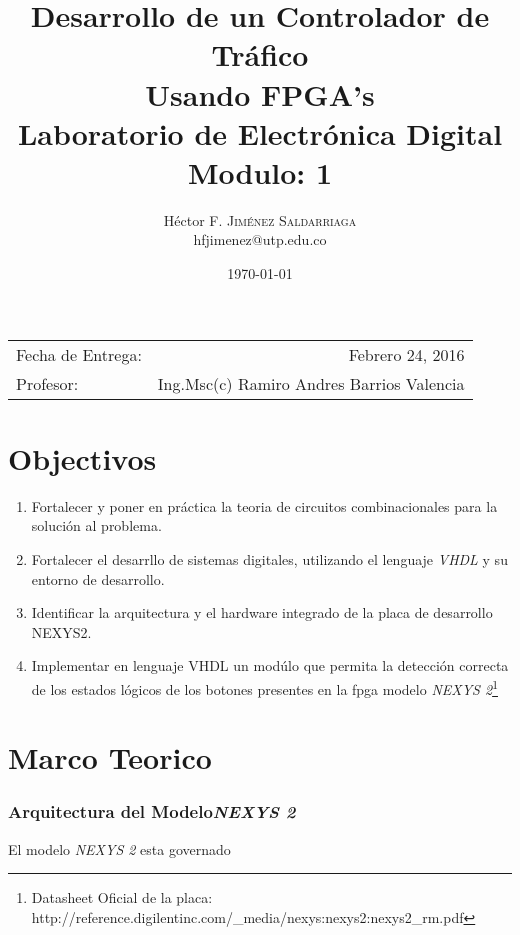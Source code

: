 \documentclass{article}
\title{Desarrollo de un Controlador de Tráfico\\ Usando FPGA's \\ Laboratorio de Electrónica Digital\\Modulo: 1} %
\author{Héctor F. \textsc{Jiménez Saldarriaga}\\ hfjimenez@utp.edu.co} %
\date{\today}                           %
\begin{document}
\maketitle                              %
\begin{center}
\begin{tabular}{l r}
Fecha de Entrega: & Febrero 24, 2016 \\
Profesor: & Ing.Msc(c) Ramiro Andres Barrios Valencia
\end{tabular}
\end{center}
\section{Objectivos}
\begin{enumerate}
  \item Fortalecer y poner en práctica la teoria de circuitos combinacionales para la solución al problema.
  \item Fortalecer el desarrllo de sistemas digitales, utilizando el lenguaje \emph{VHDL} y su entorno de desarrollo.
  \item Identificar la arquitectura y el hardware integrado de la placa de desarrollo NEXYS2.
  \item Implementar en lenguaje VHDL un modúlo que permita la detección correcta de los estados lógicos de los botones presentes en la fpga modelo \emph{NEXYS 2}\footnote{Datasheet Oficial de la placa: http://reference.digilentinc.com/_media/nexys:nexys2:nexys2_rm.pdf}
\end{enumerate}


\section{Marco Teorico}

\subsubsection{Arquitectura del Modelo\emph{NEXYS 2}}
El modelo \emph{NEXYS 2} esta governado 
\end{document}
